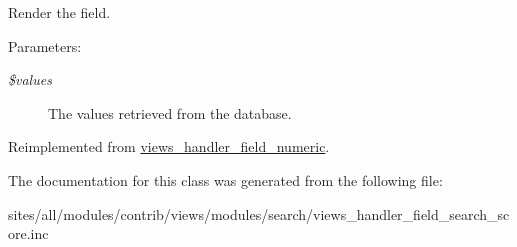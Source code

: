 Render the field.

\begin{Desc}
\item[Parameters:]
\begin{description}
\item[{\em \$values}]The values retrieved from the database. \end{description}
\end{Desc}


Reimplemented from \hyperlink{classviews__handler__field__numeric_9c76aeef951c45385fd91a22e5e656aa}{views\_\-handler\_\-field\_\-numeric}.

The documentation for this class was generated from the following file:\begin{CompactItemize}
\item 
sites/all/modules/contrib/views/modules/search/views\_\-handler\_\-field\_\-search\_\-score.inc\end{CompactItemize}

